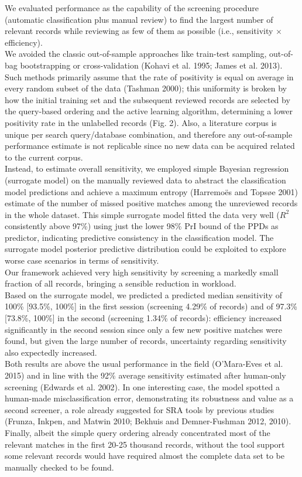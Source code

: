 \documentclass{article}
\begin{document}
We evaluated performance as the capability of the screening procedure
(automatic classification plus manual review) to find the largest number
of relevant records while reviewing as few of them as possible (i.e.,
sensitivity \(\times\) efficiency).\\
We avoided the classic out-of-sample approaches like train-test
sampling, out-of-bag bootstrapping or cross-validation (Kohavi et al.
1995; James et al. 2013). Such methods primarily assume that the rate of
positivity is equal on average in every random subset of the data
(Tashman 2000); this uniformity is broken by how the initial training
set and the subsequent reviewed records are selected by the query-based
ordering and the active learning algorithm, determining a lower
positivity rate in the unlabelled records (Fig. 2). Also, a literature
corpus is unique per search query/database combination, and therefore
any out-of-sample performance estimate is not replicable since no new
data can be acquired related to the current corpus.\\
Instead, to estimate overall sensitivity, we employed simple Bayesian
regression (surrogate model) on the manually reviewed data to abstract
the classification model predictions and achieve a maximum entropy
(Harremoës and Topsøe 2001) estimate of the number of missed positive
matches among the unreviewed records in the whole dataset. This simple
surrogate model fitted the data very well (\(R^2\) consistently above
97\%) using just the lower 98\% PrI bound of the PPDs as predictor,
indicating predictive consistency in the classification model. The
surrogate model posterior predictive distribution could be exploited to
explore worse case scenarios in terms of sensitivity.\\

Our framework achieved very high sensitivity by screening a markedly
small fraction of all records, bringing a sensible reduction in
workload.\\
Based on the surrogate model, we predicted a predicted median
sensitivity of 100\% {[}93.5\%, 100\%{]} in the first session (screening
4.29\% of records) and of 97.3\% {[}73.8\%, 100\%{]} in the second
(screening 1.34\% of records): efficiency increased significantly in the
second session since only a few new positive matches were found, but
given the large number of records, uncertainty regarding sensitivity
also expectedly increased.\\
Both results are above the usual performance in the field (O'Mara-Eves
et al. 2015) and in line with the 92\% average sensitivity estimated
after human-only screening (Edwards et al. 2002). In one interesting
case, the model spotted a human-made misclassification error,
demonstrating its robustness and value as a second screener, a role
already suggested for SRA tools by previous studies (Frunza, Inkpen, and
Matwin 2010; Bekhuis and Demner-Fushman 2012, 2010). Finally, albeit the
simple query ordering already concentrated most of the relevant matches
in the first 20-25 thousand records, without the tool support some
relevant records would have required almost the complete data set to be
manually checked to be found.\\
\end{document}
